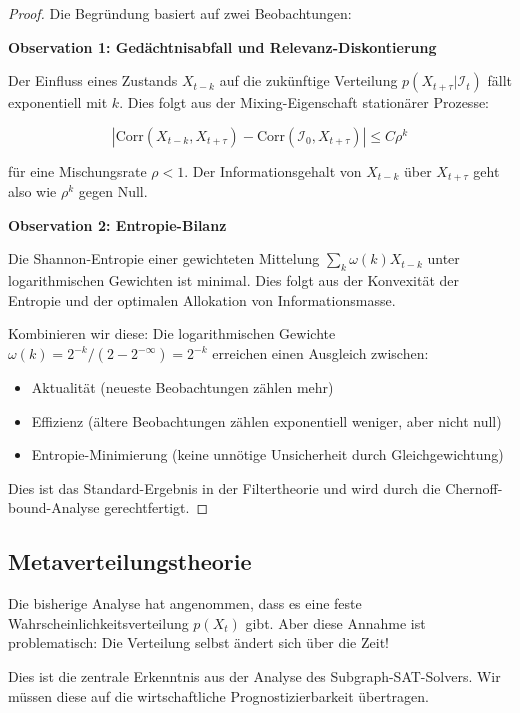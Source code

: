 \documentclass[a4paper, 12pt, twoside, openright]{report}
\theoremstyle{definition}
\theoremstyle{definition}
\begin{document}
\begin{proof}
Die Begründung basiert auf zwei Beobachtungen:

\textbf{Observation 1: Gedächtnisabfall und Relevanz-Diskontierung}

Der Einfluss eines Zustands $X_{t-k}$ auf die zukünftige Verteilung $p(X_{t+\tau} | \mathcal{I}_t)$ fällt exponentiell mit $k$. Dies folgt aus der Mixing-Eigenschaft stationärer Prozesse:

\begin{equation}
|\text{Corr}(X_{t-k}, X_{t+\tau}) - \text{Corr}(\mathcal{I}_0, X_{t+\tau})| \leq C \rho^k
\end{equation}

für eine Mischungsrate $\rho < 1$. Der Informationsgehalt von $X_{t-k}$ über $X_{t+\tau}$ geht also wie $\rho^k$ gegen Null.

\textbf{Observation 2: Entropie-Bilanz}

Die Shannon-Entropie einer gewichteten Mittelung $\sum_k \omega(k) X_{t-k}$ unter logarithmischen Gewichten ist minimal. Dies folgt aus der Konvexität der Entropie und der optimalen Allokation von Informationsmasse.

Kombinieren wir diese: Die logarithmischen Gewichte $\omega(k) = 2^{-k} / (2 - 2^{-\infty}) = 2^{-k}$ erreichen einen Ausgleich zwischen:
\begin{itemize}
  \item Aktualität (neueste Beobachtungen zählen mehr)
  \item Effizienz (ältere Beobachtungen zählen exponentiell weniger, aber nicht null)
  \item Entropie-Minimierung (keine unnötige Unsicherheit durch Gleichgewichtung)
\end{itemize}

Dies ist das Standard-Ergebnis in der Filtertheorie und wird durch die Chernoff-bound-Analyse gerechtfertigt.
\end{proof}

\subsection{Metaverteilungstheorie}

Die bisherige Analyse hat angenommen, dass es eine feste Wahrscheinlichkeitsverteilung $p(X_t)$ gibt. Aber diese Annahme ist problematisch: Die Verteilung selbst ändert sich über die Zeit!

Dies ist die zentrale Erkenntnis aus der Analyse des Subgraph-SAT-Solvers. Wir müssen diese auf die wirtschaftliche Prognostizierbarkeit übertragen.
\end{document}
